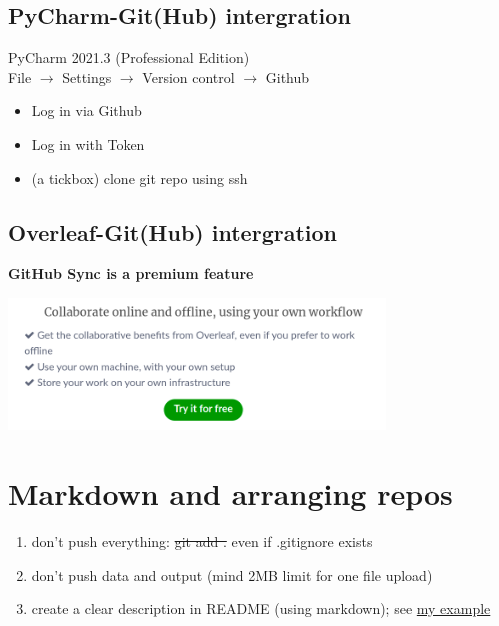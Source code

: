 \documentclass[a4paper,11pt]{article}
\begin{document}
\subsection{PyCharm-Git(Hub) intergration}

PyCharm 2021.3 (Professional Edition) \\

File $\rightarrow$ Settings $\rightarrow$ Version control $\rightarrow$ Github 

\begin{itemize}
	\item Log in via Github
	\item Log in with Token
	\item (a tickbox) clone git repo using ssh
\end{itemize}

\subsection{Overleaf-Git(Hub) intergration}

\textbf{GitHub Sync is a premium feature}

\begin{center}
	
\includegraphics[width=10cm]{pics/try_it_for_free.png}

\end{center}

 

\section{Markdown and arranging repos}

\begin{enumerate}
	\item don't push everything: \st{git add .} even if .gitignore exists
	\item don't push data and output (mind 2MB limit for one file upload)
	\item create a clear description in README (using markdown); see \href{https://github.com/kunilovskaya/dskills_workshop/blob/main/README.md}{my example}
\end{enumerate}
\end{document}

